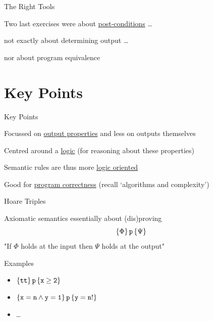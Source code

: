 \documentclass{beamer}
\begin{document}
\begin{frame}{The Right Tools}

        Two last exercises were about \alert{\underline{post-conditions}} \dots

        not exactly about determining output \dots

        nor about program equivalence
        
        \pause
        \bigskip
        \bigskip
        \begin{center}
        \end{center}
\end{frame}

\section{Key Points}

\begin{frame}{Key Points}

        Focussed on \alert{\underline{output properties}} and less on outputs
        themselves

        Centred around a \alert{\underline{logic}} 
        {\small (for reasoning about these
        properties)}

        Semantic rules are thus more \alert{\underline{logic oriented}}

        \bigskip
        \pause
        Good for \alert{\underline{program correctness}} 
        {\small (recall `algorithms and complexity')}
\end{frame}

\begin{frame}{Hoare Triples}

        Axiomatic semantics essentially about (dis)proving
        \[
                \{ \Phi \} \, \mathtt{p} \, \{ \Psi \}
        \]
        "If $\Phi$ holds at the input then $\Psi$ holds at the output"

        \bigskip
        \begin{block}{Examples}
                \begin{itemize}
                        \item $\{ \mathtt{tt} \} \, \mathtt{p} \, \{ \mathtt{x \geq 2} \}$
                        \item $\{ \mathtt{x =n \wedge y = 1} \} \, \mathtt{p} \, \{ \mathtt{y = n!} \}$
                        \item \dots
                \end{itemize}
        \end{block}
\end{frame}
\end{document}
